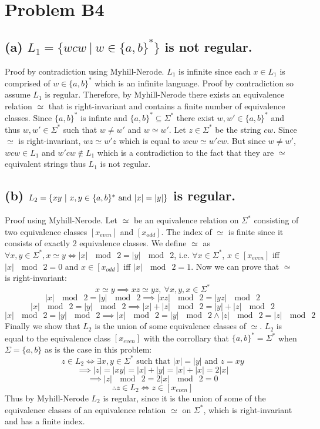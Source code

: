 \documentclass[12pt]{article}
\begin{document}
\pagestyle{plain}

\section*{Problem B4}
\subsection*{(a) $L_1 = \{wcw\ |\ w \in \{a,b\}^*\}$
\textnormal {is} not \textnormal{regular.}}
Proof by contradiction using Myhill-Nerode. $L_1$ is infinite since
each $x \in L_1$ is comprised of $w \in \{a,b\}^*$ which is an infinite
language. Proof by contradiction so assume $L_1$ is regular. Therefore, by
Myhill-Nerode there exists an equivalence relation $\simeq$ that is
right-invariant and contains a finite number of equivalence classes. Since
$\{a,b\}^*$ is infinte and $\{a,b\}^* \subseteq \Sigma^*$ there exist
$w,w' \in \{a,b\}^*$ and thus $w,w'\in \Sigma^*$ such that
$w \neq w'$ and $w \simeq w'$. Let $z \in \Sigma^*$ be the string $cw$.
Since $\simeq$ is right-invariant, $wz \simeq w'z$ which is
equal to $wcw \simeq w'cw$. But since $w \neq w'$, $wcw \in L_1$
and $w'cw \notin L_1$ which is a contradiction to the fact that they are
$\simeq$ equivalent strings thus $L_1$ is not regular.

\subsection*{(b) $L_2 = \{xy\ |\ x,y \in \{a,b\}^*
\textnormal{ and } |x| = |y|\}$ is \textnormal{regular.}}
Proof using Myhill-Nerode. Let $\simeq$ be an equivalence relation on
$\Sigma^*$ consisting of two equivalence classes $[x_{even}]$ and $[x_{odd}]$.
The index of $\simeq$ is finite since it consists of exactly 2
equivalence classes. We define $\simeq$ as $\forall x,y \in \Sigma^*,
x \simeq y \iff |x|\ \mod\ 2 = |y|\ \mod\ 2$, i.e. $\forall x \in \Sigma^*$,
$x \in [x_{even}]$ iff $|x|\ \mod\ 2 = 0$ and $x \in [x_{odd}]$ iff
$|x|\ \mod\ 2 = 1$. Now we can prove that $\simeq$ is right-invariant:
$$ x \simeq y \implies xz \simeq yz,\ \forall x,y,x \in \Sigma^*$$
$$ |x|\ \mod\ 2 = |y|\ \mod\ 2 \implies |xz|\ \mod\ 2 = |yz|\ \mod\ 2$$
$$ |x|\ \mod\ 2 = |y|\ \mod\ 2 \implies |x|+|z|\ \mod\ 2 = |y|+|z|\ \mod\ 2$$
$$ |x|\ \mod\ 2 = |y|\ \mod\ 2 \implies |x|\ \mod\ 2 = |y|\ \mod\ 2 \wedge
|z|\ \mod\ 2 = |z|\ \mod\ 2$$
Finally we show that $L_2$ is the union of some equivalence classes of $\simeq$.
$L_2$ is equal to the equivalence class $[x_{even}]$ with the corrollary that
$\{a,b\}^* = \Sigma^*$ when $\Sigma = \{a,b\}$ as is the case in this problem:
$$ z \in L_2 \iff \exists x,y \in \Sigma^* \text{ such that } |x| = |y|
\text{ and } z = xy$$
$$\implies |z| = |xy| = |x| + |y| = |x| + |x| = 2|x|$$
$$\implies |z|\ \mod\ 2 = 2|x|\ \mod\ 2 = 0$$
$$\therefore z \in L_2 \iff z \in [x_{even}]$$
Thus by Myhill-Nerode $L_2$ is regular, since it is the union of some of the
equivalence classes of an equivalence relation $\simeq$ on $\Sigma^*$, which
is right-invariant and has a finite index.
\end{document}
